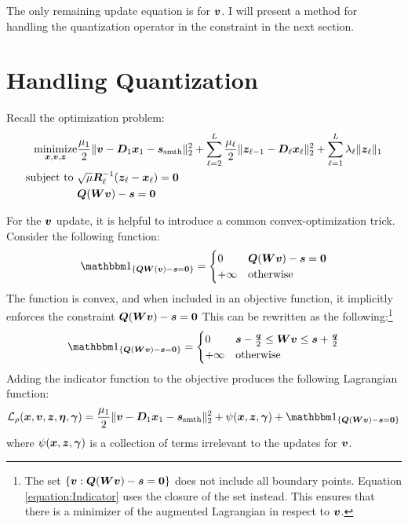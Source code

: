 The only remaining update equation is for $\bm{v}$. I will present a method for handling the quantization operator in the constraint in the next section.

\section{Handling Quantization}



Recall the optimization problem:
\begin{equation}
\begin{aligned}
\operatorname*{\text{minimize}}_{\bm{x},\bm{v},\bm{z}} & \frac{\mu_1}{2}\|\bm{v} - \bm{D}_1\bm{x}_1  - \bm{s}_{\text{smth}}\|_2^2 + \sum_{\ell = 2}^L \frac{\mu_{\ell}}{2}\|\bm{z}_{\ell - 1} - \bm{D}_{\ell}\bm{x}_{\ell}\|_2^2 + \sum_{\ell = 1}^L \lambda_{\ell}\|\bm{z}_{\ell}\|_1 \\
\text{subject to } & \sqrt{\mu}\bm{R}_{\ell}^{-1}(\bm{z}_{\ell} - \bm{x}_{\ell}) = \bm{0} \\
                   & \bm{Q}(\bm{W}\bm{v}) - \bm{s} = \bm{0}
\end{aligned}
\end{equation}

For the $\bm{v}$ update, it is helpful to introduce a common convex-optimization trick. Consider the following function:
\begin{equation}
\indicator_{\{\mQ\mW(\vv) - \vs = \vzero\}} = \begin{cases} 0 & \mQ(\mW\vv) - \vs = \vzero \\ + \infty & \text{otherwise} \end{cases}
\end{equation}
%
The function is convex, and when included in an objective function, it implicitly enforces the constraint $\bm{Q}(\bm{W}\bm{v}) - \bm{s} = \bm{0}$ This can be rewritten as the following:\footnote{The set $\{\bm{v}: \bm{Q}(\bm{W}\bm{v}) - \bm{s} = \bm{0}\}$ does not include all boundary points. Equation \ref{equation:Indicator} uses the closure of the set instead. This ensures that there is a minimizer of the augmented Lagrangian in respect to $\bm{v}$.} 
%
\begin{equation} \label{equation:Indicator}
\indicator_{\{\mQ(\mW\vv) - \vs = \vzero\}} = \begin{cases} 0 & \vs - \frac{\vq}{2} \leq \mW\vv \leq \vs + \frac{\vq}{2} \\ + \infty & \text{otherwise} \end{cases}
\end{equation}
%
Adding the indicator function to the objective produces the following Lagrangian function: 
%
\begin{equation}
\begin{split}
\L_{\rho}(\vx,\vv,\vz,\veta,\vgamma) =  \frac{\mu_1}{2}\|\vv - \mD_1\vx_1  - \vs_{\text{smth}}\|_2^2 + \psi(\vx,\vz,\vgamma) + \indicator_{\{\mQ(\mW\vv) - \vs = \vzero\}}
\end{split}
\end{equation}
%
where $\psi(\bm{x},\bm{z},\bm{\gamma})$ is a collection of terms irrelevant to the updates for $\bm{v}$.

